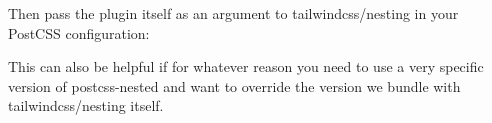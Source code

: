Then pass the plugin itself as an argument to {\ttfamily tailwindcss/nesting} in your Post\+CSS configuration\+:


\begin{DoxyCode}{0}
\DoxyCodeLine{\ \ plugins:\ [}
\DoxyCodeLine{\ \ ]}
\DoxyCodeLine{\}}

\end{DoxyCode}


This can also be helpful if for whatever reason you need to use a very specific version of {\ttfamily postcss-\/nested} and want to override the version we bundle with {\ttfamily tailwindcss/nesting} itself. 